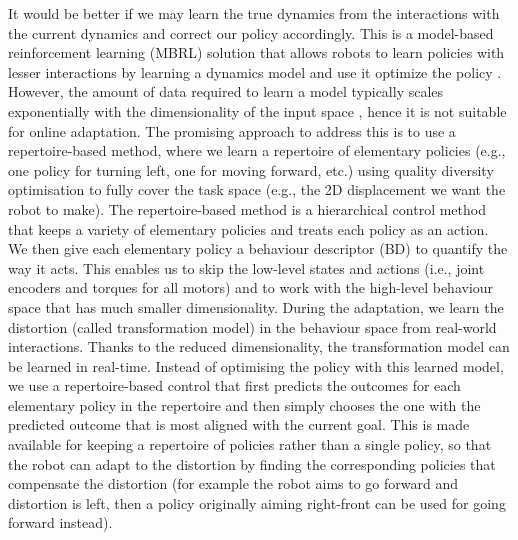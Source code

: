 It would be better if we may learn the true dynamics from the interactions with the current dynamics and
correct our policy accordingly. This is a model-based reinforcement learning (MBRL) solution that allows robots to learn policies with lesser interactions by learning a dynamics model and use it optimize the policy \cite{MBRL, black_box_search, policy_search}. 
However, the amount of data required to learn a model typically scales exponentially with the dimensionality of the input space \cite{curse_of_dim}, hence it is not suitable for online adaptation. 
The promising approach to address this is to use a repertoire-based method, where we learn a repertoire of elementary policies (e.g., one policy for turning left, one for moving forward, etc.) using quality diversity optimisation \cite{QD} to fully cover the task space (e.g., the 2D displacement we want the robot to make). 
The repertoire-based method is a hierarchical control method that keeps a variety of elementary policies and treats each policy as an action. 
We then give each elementary policy a behaviour descriptor (BD) to quantify the way it acts.
This enables us to skip the low-level states and actions (i.e., joint encoders and torques for all motors) and to work with the high-level behaviour space that has much smaller dimensionality.
During the adaptation, we learn the distortion (called transformation model) in the behaviour space from real-world interactions. Thanks to the reduced dimensionality, the transformation model can be learned in real-time.
Instead of optimising the policy with this learned model, we use a repertoire-based control that first predicts the outcomes for each elementary policy in the repertoire and then simply chooses the one with the predicted outcome that is most aligned with the current goal. 
This is made available for keeping a repertoire of policies rather than a single policy, so that the robot can adapt to the distortion by finding the corresponding policies that compensate the distortion (for example the robot aims to go forward and distortion is left, then a policy originally aiming right-front can be used for going forward instead).


